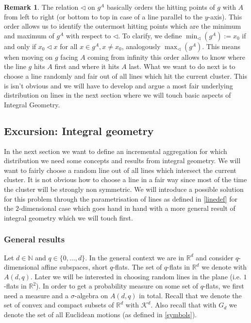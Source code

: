 \documentclass[12pt,a4paper]{scrartcl}
\newcommand{\R}{\mathbb{R}} %
\newcommand{\N}{\mathbb{N}} %
\newcommand{\K}{\mathcal{K}}
\newcommand{\1}{\mathbbm{1}}
\theoremstyle{definition}
\newtheorem{remark}{Remark}[subsection]
\numberwithin{equation}{section}
\begin{document}
\begin{remark}
	The relation $\triangleleft$ on $g^A$ basically orders the hitting points of $g$ with $A$ from left to right (or bottom to top in case of a line parallel to the $y$-axis). This order allows us to identify the outermost hitting points which are the minimum and maximum of $g^A$ with respect to $\triangleleft$. To clarify, we define $\min_\triangleleft (g^A) := x_0$ if and only if $x_0 \triangleleft x$ for all $x\in g^A,x\neq x_0$, analogously $\max_\triangleleft(g^A)$. This means when moving on $g$ facing $A$ coming from infinity this order allows to know where the line $g$ hits $A$ first and where it hits $A$ last. What we want to do next is to choose a line randomly and fair out of all lines which hit the current cluster. This is isn't obvious and we will have to develop and argue a most fair underlying distribution on lines in the next section where we will touch basic aspects of Integral Geometry. 
\end{remark}


\subsection{Excursion: Integral geometry}

In the next section we want to define an incremental aggregation for which distribution we need some concepts and results from integral geometry. We will want to fairly choose a random line out of all lines which intersect the current cluster. It is not obvious how to choose a line in a fair way since most of the time the cluster will be strongly non symmetric. We will introduce a possible solution for this problem through the parametrisation of lines as defined in \ref{linedef} for the $2$-dimensional case which goes hand in hand with a more general result of integral geometry which we will touch first.

\subsubsection{General results}

Let $d\in\N$ and $q\in \{0,\dots,d\}$. In the general context we are in $\R^d$ and consider $q$-dimensional affine subspaces, short $q$-flats. The set of $q$-flats in $\R^d$ we denote with $A(d,q)$. Later we will be interested in choosing random lines in the plane (i.e. $1$-flats in $\R^2$). In order to get a probability measure on some set of $q$-flats, we first need a measure and a $\sigma$-algebra on $A(d,q)$ in total. Recall that we denote the set of convex and compact subsets of $\R^d$ with $\K^d$. Also recall that with $G_d$ we denote the set of all Euclidean motions (as defined in \ref{symbols}).
\end{document}
